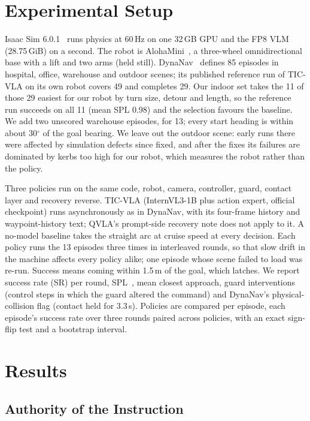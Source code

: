 \documentclass[runningheads]{llncs}
\begin{document}
\section{Experimental Setup}
\label{sec:setup}

Isaac Sim 6.0.1~\cite{isaacsim} runs physics at 60\,Hz on one 32\,GB GPU and the FP8 VLM
(28.75\,GiB) on a second. The robot is AlohaMini~\cite{alohamini}, a three-wheel
omnidirectional base with a lift and two arms (held still).
DynaNav~\cite{huang2026ticvla} defines 85 episodes in hospital, office, warehouse and outdoor
scenes; its published reference run of TIC-VLA on its own robot covers 49 and completes 29.
Our indoor set takes the 11 of those 29 easiest for our robot by turn size, detour and length,
so the reference run succeeds on all 11 (mean SPL 0.98) and the selection favours the
baseline. We add two unscored warehouse episodes, for 13; every start heading is within
about 30$^\circ$ of the goal bearing. We leave out the outdoor scene: early runs there were
affected by simulation defects since fixed, and after the fixes its failures are dominated by
kerbs too high for our robot, which measures the robot rather than the policy.

Three policies run on the same code, robot, camera, controller, guard, contact layer and
recovery reverse. TIC-VLA (InternVL3-1B plus action expert, official checkpoint) runs
asynchronously as in DynaNav, with its four-frame history and waypoint-history text; QVLA's
prompt-side recovery note does not apply to it. A no-model baseline takes the straight arc at
cruise speed at every decision. Each policy runs the 13 episodes three times in interleaved
rounds, so that slow drift in the machine affects every policy alike; one episode whose scene
failed to load was re-run. Success means coming within 1.5\,m of the goal, which latches. We
report success rate (SR) per round, SPL~\cite{anderson2018evaluation}, mean closest approach,
guard interventions (control steps in which the guard altered the command) and DynaNav's
physical-collision flag (contact held for 3.3\,s). Policies are compared per episode, each
episode's success rate over three rounds paired across policies, with an exact sign-flip test
and a bootstrap interval.

\section{Results}
\label{sec:results}

\subsection{Authority of the Instruction}
\label{sec:authority}
\end{document}
